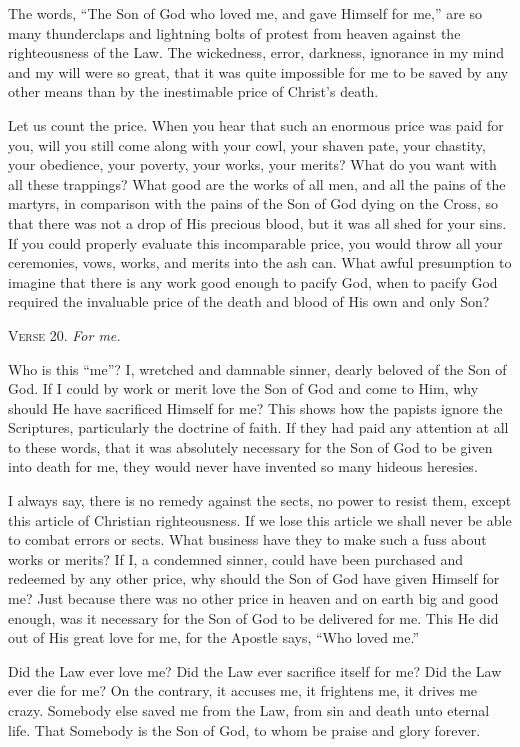 The words, “The Son of God who loved me, and gave Himself for me,” are so many thunderclaps and lightning bolts of protest from heaven against the righteousness of the Law. The wickedness, error, darkness, ignorance in my mind and my will were so great, that it was quite impossible for me to be saved by any other means than by the inestimable price of Christ’s death.

Let us count the price. When you hear that such an enormous price was paid for you, will you still come along with your cowl, your shaven pate, your chastity, your obedience, your poverty, your works, your merits? What do you want with all these trappings? What good are the works of all men, and all the pains of the martyrs, in comparison with the pains of the Son of God dying on the Cross, so that there was not a drop of His precious blood, but it was all shed for your sins. If you could properly evaluate this incomparable price, you would throw all your ceremonies, vows, works, and merits into the ash can. What awful presumption to imagine that there is any work good enough to pacify God, when to pacify God required the invaluable price of the death and blood of His own and only Son?

\textsc{Verse} 20. \emph{For me.}

Who is this “me”? I, wretched and damnable sinner, dearly beloved of the Son of God. If I could by work or merit love the Son of God and come to Him, why should He have sacrificed Himself for me? This shows how the papists ignore the Scriptures, particularly the doctrine of faith. If they had paid any attention at all to these words, that it was absolutely necessary for the Son of God to be given into death for me, they would never have invented so many hideous heresies.

I always say, there is no remedy against the sects, no power to resist them, except this article of Christian righteousness. If we lose this article we shall never be able to combat errors or sects. What business have they to make such a fuss about works or merits? If I, a condemned sinner, could have been purchased and redeemed by any other price, why should the Son of God have given Himself for me? Just because there was no other price in heaven and on earth big and good enough, was it necessary for the Son of God to be delivered for me. This He did out of His great love for me, for the Apostle says, “Who loved me.”

Did the Law ever love me? Did the Law ever sacrifice itself for me? Did the Law ever die for me? On the contrary, it accuses me, it frightens me, it drives me crazy. Somebody else saved me from the Law, from sin and death unto eternal life. That Somebody is the Son of God, to whom be praise and glory forever.

